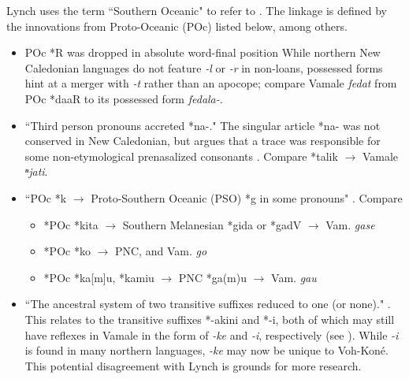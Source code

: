 Lynch uses the term ``Southern Oceanic" to refer to  \parencites{lynch_southern_1999}[313]{lynch_efate-erromango_2004}. The linkage is defined by the innovations from Proto-Oceanic (POc) listed below, among others. 
\begin{itemize}
\item POc *R was dropped in absolute word-final position \parencite[313]{lynch_efate-erromango_2004} %
While northern New Caledonian languages do not feature \textit{-l} or \textit{-r} in non-loans, possessed forms hint at a merger with \textit{-t} rather than an apocope; compare Vamale \textit{fedat}  from POc *daaR to its possessed form \mbox{\textit{fedala-}.}
\item ``Third person pronouns accreted *na-." \parencite[313]{lynch_efate-erromango_2004} The singular article *na- was not conserved in New Caledonian, but \textcite[197--201]{ozanne-rivierre_proto-oceanic_1992} argues that a trace was responsible for some non-etymological prenasalized consonants \parencite[316]{lynch_efate-erromango_2004}. Compare *talik  $\rightarrow$ Vamale \textit{ⁿjati}. 
\item ``POc *k $\rightarrow$ Proto-Southern Oceanic (PSO) *g in some pronouns" \parencite[316]{lynch_efate-erromango_2004}. Compare \begin{itemize}
\item *POc *kita  $\rightarrow$ Southern Melanesian *gida or *gadV $\rightarrow$ Vam. \textit{gase}
\item  *POc *ko  $\rightarrow$ PNC, and Vam. \textit{go}
\item *POc *ka[m]u, *kamiu  $\rightarrow$ PNC *ga(m)u $\rightarrow$ Vam. \textit{gau} 
\end{itemize}
\item ``The ancestral system of two transitive suffixes reduced to one (or none)." \parencite[313]{lynch_efate-erromango_2004}. This relates to the transitive suffixes *-akini and *-i, both of which may still have reflexes in Vamale in the form of \textit{-ke} and \textit{-i}, respectively (see ). While \textit{-i} is found in many northern languages, \textit{-ke} may now be unique to Voh-Koné. This potential disagreement with Lynch is grounds for more research.
\end{itemize}
\largerpage

